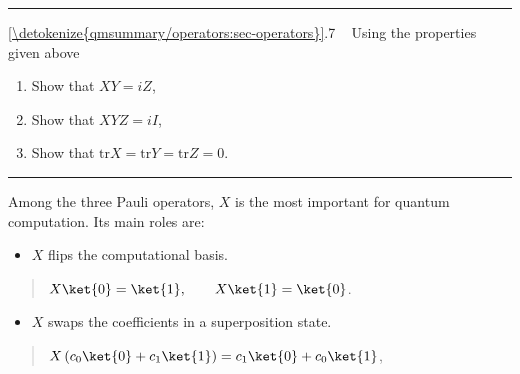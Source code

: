 \documentclass[letterpaper,10pt,english]{jupyterBook}
\begin{document}
\bigskip\hrule\bigskip


\sphinxAtStartPar
{} \hyperref[\detokenize{qmsummary/operators:sec-operators}]{\ref{\detokenize{qmsummary/operators:sec-operators}}}.7     Using the properties given above
\begin{enumerate}
%
\item {}
\sphinxAtStartPar
Show that \(X Y = i Z\),

\item {}
\sphinxAtStartPar
Show that \(XYZ = i I\),

\item {}
\sphinxAtStartPar
Show that \(\text{tr} X = \text{tr} Y = \text{tr} Z = 0\).

\end{enumerate}


\bigskip\hrule\bigskip


\sphinxAtStartPar
Among the three Pauli operators, \(X\) is the most important for quantum computation. Its main roles are:
\begin{itemize}
\item {}
\sphinxAtStartPar
\(X\) flips the computational basis.

\end{itemize}
\begin{quote}

\sphinxAtStartPar
\(X \ket{0} = \ket{1}, \qquad X \ket{1} = \ket{0}\).
\end{quote}
\begin{itemize}
\item {}
\sphinxAtStartPar
\(X\) swaps the coefficients in a superposition state.

\end{itemize}
\begin{quote}

\sphinxAtStartPar
\(X \left(c_0\ket{0} + c_1 \ket{1}\right) = c_1\ket{0} + c_0 \ket{1}\),
\end{quote}
\end{document}
